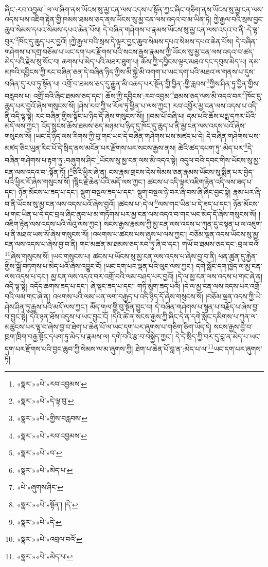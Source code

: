 ཞིང་:རབ་འབྱམ་\footnote{«སྣར་»«པེ་»རབ་འབྱམས་}ལ་ལ་ཞིག་ནས་ཡོངས་སུ་མྱ་ངན་ལས་འདས་པ་སྟོན་ཀྱང་ཞིང་གཅིག་ནས་ཡོངས་སུ་མྱ་ངན་ལས་འདས་པས་འཇིག་རྟེན་གྱི་ཁམས་ཐམས་ཅད་ནས་ཡོངས་སུ་མྱ་ངན་ལས་འདའ་བ་མ་ཡིན་ཏེ། ཀྱེ་རྒྱལ་བའི་སྲས་བྱང་ཆུབ་སེམས་དཔའ་སེམས་དཔའ་ཆེན་པོས། དེ་བཞིན་གཤེགས་པ་རྣམས་ཡོངས་སུ་མྱ་ངན་ལས་འདའ་བ་ནི་:དེ་ལྟ་བུར་\footnote{«སྣར་»«པེ་»དེ་ལྟ་བུ་}ཁོང་དུ་ཆུད་པར་བྱའོ། །ཀྱེ་རྒྱལ་བའི་སྲས་དེ་ལྟར་བྱང་ཆུབ་སེམས་དཔའ་སེམས་དཔའ་ཆེན་པོས། དེ་བཞིན་གཤེགས་པ་དགྲ་བཅོམ་པ་ཡང་དག་པར་རྫོགས་པའི་སངས་རྒྱས་རྣམས་ཀྱི་ཡོངས་སུ་མྱ་ངན་ལས་འདའ་བ་ཚད་མེད་པའི་རྗེས་སུ་སོང་བ། ཆགས་པ་མེད་པའི་མཐར་ཐུག་པ། ཆོས་ཀྱི་དབྱིངས་ལྟར་མཐའ་དང་དབུས་མེད་པ། ནམ་མཁའི་དབྱིངས་ཀྱི་རང་བཞིན་ཅན་དེ་བཞིན་ཉིད་ཀྱིས་མི་སྐྱེ་མི་འགག་པ་ཡང་དག་པའི་མཐའ་ལ་གནས་པ་དུས་བཞིན་དུ་རབ་ཏུ་སྟོན་པ། འགྲོ་བ་ཐམས་ཅད་དུ་རྒྱུན་མི་འཆད་པར་སྔོན་གྱི་བྱིན་:གྱི་རླབས་\footnote{«སྣར་»«པེ་»གྱིས་བརླབས་}ཀྱིས་ཤིན་ཏུ་བྱིན་གྱིས་བརླབས་པ། འགྲོ་བའི་ཞིང་ཐམས་ཅད་དང་། ཆོས་ཀྱི་དབྱིངས་:རབ་འབྱམ་\footnote{«སྣར་»«པེ་»རབ་འབྱམས་}ཐམས་ཅད་ལས་མི་འདའ་བར་\footnote{«སྣར་»«པེ་»བ་}ཁོང་དུ་ཆུད་པར་བྱའོ་ཞེས་གསུངས་སོ། །ཤེས་རབ་ཀྱི་ཕ་རོལ་ཏུ་ཕྱིན་པ་ལས་ཀྱང་། རབ་འབྱོར་མྱ་ངན་ལས་འདས་པ་འདི་ནི་འདི་ལྟ་སྟེ། རང་བཞིན་གྱིས་སྟོང་པ་ཉིད་དོ་ཞེས་གསུངས་སོ།། །།བམ་པོ་བཞི་པ། དམ་པའི་ཆོས་པདྨ་དཀར་པོའི་མདོ་ལས་ཀྱང་། འོད་སྲུངས་ཆོས་ཐམས་ཅད་མཉམ་པ་ཉིད་དུ་ཁོང་དུ་ཆུད་པ་ནི་མྱ་ངན་ལས་འདས་པའོ་ཞེས་གསུངས་སོ། །ཡང་དེ་ཉིད་ལས་རིགས་ཀྱི་བུ་གང་ཡང་དེ་བཞིན་གཤེགས་པས་མཛད་པ་དེ། དེ་བཞིན་གཤེགས་པས་མཛད་ཅིང་ཡུན་རིང་པོ་དེ་སྲིད་ནས་མངོན་པར་རྫོགས་པར་སངས་རྒྱས་ནས། ཚེའི་ཚད་དཔག་ཏུ་:མེད་པར་\footnote{«སྣར་»«པེ་»མེད་པ་}དེ་བཞིན་གཤེགས་པ་རྟག་ཏུ་:བཞུགས་ཤིང་\footnote{«པེ་»ཞུགས་ཤིང་}ཡོངས་སུ་མྱ་ངན་ལས་མི་འདའ་སྟེ། འདུལ་བའི་དབང་གིས་ཡོངས་སུ་མྱ་ངན་ལས་འདའ་བ་:སྟོན་ཏོ། །\footnote{«སྣར་»«པེ་»སྟོན་། །དེ་}ཅིའི་ཕྱིར་ཞེ་ན། ངས་རྣམ་གྲངས་དེས་སེམས་ཅན་རྣམས་ཡོངས་སུ་སྨིན་པར་བྱེད་པའི་ཕྱིར་རོ་ཞེས་གསུངས་སོ། །སྙིང་རྗེ་ཆེན་པོའི་མདོ་ལས་ཀྱང་། ཚངས་པ་འདི་ལྟར་འཇིག་རྟེན་འདི་ལས་ཟད་པ་དང་། ཉོན་མོངས་པ་ཟད་པ་དང་། སྡུག་བསྔལ་ཟད་པ་དང་། སྡུག་བསྔལ་ཉེ་བར་ཞི་བས་ཞི་ཞིང་བྱང་སྟེ། རྣམ་པར་ཞི་བ་ནི་ཡོངས་སུ་མྱ་ངན་ལས་འདས་པའོ་ཞེས་བྱའོ། །ཚངས་པ་:དེ་ལ་\footnote{«སྣར་»«པེ་»དེ་}ལས་གང་ཡིན་པ་དེ་ཟད་པ་དང་། ཉོན་མོངས་པ་གང་ཡིན་པ་དེ་དང་བྲལ་ཞིང་ནུབ་པ་མ་གཏོགས་པར་མྱ་ངན་ལས་འདའ་བ་གང་ཡང་མེད་དོ་ཞེས་གསུངས་སོ། །འཇིག་རྟེན་ལས་འདས་པའི་ལེའུ་ལས་ཀྱང་། སངས་རྒྱས་རྣམས་ཀྱི་མྱ་ངན་ལས་འདས་པ་ཀུན་དུ་བསྟན་པ་ལ་འཇུག་པ་ནི་མཐའ་ཡས་སོ་ཞེས་གསུངས་སོ། །འཕགས་པ་ཚངས་པས་ཞུས་པ་ལས་ཀྱང་། བཅོམ་ལྡན་འདས་ཡོངས་སུ་མྱ་ངན་ལས་འདས་པ་ཞེས་བྱ་བ་ནི། གང་མཚན་མ་ཐམས་ཅད་རབ་ཏུ་ཞི་བ་དང་། གཡོ་བ་ཐམས་ཅད་དང་:བྲལ་བའོ་\footnote{«སྣར་»«པེ་»འབྲལ་བའོ་}ཞེས་གསུངས་སོ། །ཡང་གསུངས་པ། ཚངས་པ་ཡོངས་སུ་མྱ་ངན་ལས་འདས་པ་ཞེས་བྱ་བ་ནི། ཕན་ཚུན་དུ་རྐྱེན་གྱིས་སྒྲོ་བཏགས་པ་མེད་པའོ་ཞེས་འབྱུང་ངོ། །ཡང་དག་པར་ལྡན་པའི་ལུང་ལས་ཀྱང་། དགེ་སློང་དག་ཁྱེད་ལ་མྱ་ངན་ལས་འདས་པ་དང་། མྱ་ངན་ལས་འདའ་བར་འགྲོ་བའི་ལམ་བཤད་པར་བྱའོ། །དེ་ལ་མྱ་ངན་ལས་འདས་པ་གང་ཞེ་ན། འདི་ལྟ་སྟེ། འདོད་ཆགས་ཟད་པ་དང་། ཞེ་སྡང་ཟད་པ་དང་། གཏི་མུག་ཟད་པའོ། །དེ་ལ་མྱ་ངན་ལས་འདས་པར་འགྲོ་བའི་ལམ་གང་ཞེ་ན། འཕགས་པའི་ལམ་ཡན་ལག་བརྒྱད་པ་འདི་ཉིད་དོ་ཞེས་གསུངས་སོ། །བཅོམ་ལྡན་འདས་ཀྱི་ཡེ་ཤེས་ཤིན་ཏུ་རྒྱས་པའི་མདོ་ལས་ཀྱང་། མཽད་གལ་གྱི་བུ་སྔོན་བྱུང་བ། དེ་བཞིན་གཤེགས་པ་སྙན་པ་བརྗོད་པ་ཞེས་བྱ་བ་བྱུང་སྟེ། དེའི་ཉན་ཐོས་འདུས་པ་ཡང་བྱུང་ངོ། །དེའི་ཚེ་ན་སངས་རྒྱས་ཀྱི་ཞིང་དེ་ན་དགེ་སློང་དམིགས་པ་ཀུན་ལ་མཚུངས་པར་ལྟ་བ་ཞེས་བྱ་བ་ཐེག་པ་ཆེན་པོ་ལ་ཡང་དག་པར་ཞུགས་པ་གཅིག་ཅིག་ཡོད་དེ། སངས་རྒྱས་བྱེ་བ་ཁྲག་ཁྲིག་བརྒྱ་སྟོང་དཔག་ཏུ་མེད་པ་རྣམས་ལ། དགེ་བའི་རྩ་བ་བསྐྱེད་ཀྱང་། དེ་དེ་སྲིད་ཀྱི་བར་དུ་བླ་ན་མེད་པ་ཡང་དག་པར་རྫོགས་པའི་བྱང་ཆུབ་ཀྱི་སེམས་ལ་མ་ཞུགས་ཀྱི། ཐེག་པ་ཆེན་པོ་བླ་ན་:མེད་པ་ལ་\footnote{«སྣར་»«པེ་»མེད་པ་}ཡང་དག་པར་ཞུགས་ཏེ། 